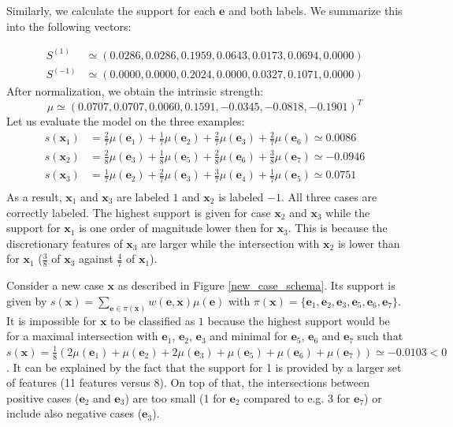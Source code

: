 \documentclass[preprint,12pt]{elsarticle}
\theoremstyle{definition}
\begin{document}
Similarly, we calculate the support for each $\mathbf e$ and both labels. We summarize this into the following vectors:

\begin{align*}
S^{(1)} & \simeq (
0.0286,
0.0286,
0.1959 ,
0.0643,
0.0173,
0.0694, 
0.0000) \\ S^{(-1)} &\simeq (
0.0000,
0.0000,
0.2024,
0.0000,
0.0327,
0.1071, 
0.0000)\end{align*} After normalization, we obtain the intrinsic strength:
$$\mu \simeq (0.0707, 0.0707, 0.0060, 0.1591, -0.0345, -0.0818, -0.1901)^T$$
Let us evaluate the model on the three examples:
\begin{align*}
  s(\mathbf x_1) & = \frac{2}{7}\mu(\mathbf e_1) + \frac{1}{7}\mu(\mathbf e_2) + \frac{2}{7}\mu(\mathbf e_3) + \frac{2}{7}\mu(\mathbf e_6) \simeq 0.0086\\
  s(\mathbf x_2) & = \frac{2}{8}\mu(\mathbf e_3) + \frac{1}{8}\mu(\mathbf e_5) + \frac{2}{8}\mu(\mathbf e_6) + \frac{3}{8}\mu(\mathbf e_7) \simeq -0.0946\\
  s(\mathbf x_3) & = \frac{1}{7}\mu(\mathbf e_2) + \frac{2}{7}\mu(\mathbf e_3) + \frac{3}{7}\mu(\mathbf e_4) + \frac{1}{7}\mu(\mathbf e_5) \simeq 0.0751\\
\end{align*}
As a result, $\mathbf x_1$ and $\mathbf x_3$ are labeled $1$ and $\mathbf x_2$ is labeled $-1$. All three cases are correctly labeled. The highest support is given for case $\mathbf x_2$ and $\mathbf x_3$ while the support for $\mathbf x_1$ is one order of magnitude lower then for $\mathbf x_3$. This is because the discretionary features of $\mathbf x_3$ are larger while the intersection with $\mathbf x_2$ is lower than for $\mathbf x_1$ ($\frac 3 8$ of $\mathbf x_3$ against $\frac 4 7$ of $\mathbf x_1$).

Consider a new case $\mathbf x$ as described in Figure \ref{new_case_schema}. Its support is given by $s(\mathbf x) = \underset{\mathbf e \in \pi(\mathbf x)}{\sum} w(\mathbf e, \mathbf x)\mu(\mathbf e)$ with $\pi(\mathbf x) = \{ \mathbf e_1, \mathbf e_2, \mathbf e_3, \mathbf e_5, \mathbf e_6, \mathbf e_7\}$. It is impossible for $\mathbf x$ to be classified as $1$ because the highest support would be for a maximal intersection with $\mathbf e_1$, $\mathbf e_2$, $\mathbf e_3$ and minimal for $\mathbf e_5$, $\mathbf e_6$ and $\mathbf e_7$ such that $s(\mathbf x) = \frac{1}{8}(2 \mu(\mathbf e_1) + \mu(\mathbf e_2) + 2 \mu(\mathbf e_3) + \mu(\mathbf e_5) + \mu(\mathbf e_6) + \mu(\mathbf e_7)) \simeq -0.0103 < 0$. It can be explained by the fact that the support for 1 is provided by a larger set of features (11 features versus 8). On top of that, the intersections between positive cases ($\mathbf e_2$ and $\mathbf e_3$) are too small (1 for $\mathbf e_2$ compared to e.g. 3 for $\mathbf e_7$) or include also negative cases ($\mathbf e_3$).
\end{document}
